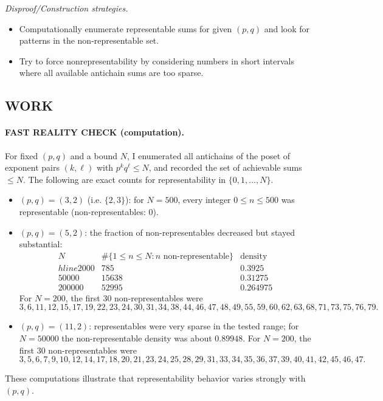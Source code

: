 \emph{Disproof/Construction strategies.}
\begin{itemize}
\item Computationally enumerate representable sums for given $(p,q)$ and look for patterns in the non-representable set.
\item Try to force nonrepresentability by considering numbers in short intervals where all available antichain sums are too sparse.
\end{itemize}

\subsection*{WORK}
\paragraph{FAST REALITY CHECK (computation).}
For fixed $(p,q)$ and a bound $N$, I enumerated all antichains of the poset of exponent pairs $(k,\ell)$ with $p^k q^\ell\le N$, and recorded the set of achievable sums $\le N$.
The following are exact counts for representability in $\{0,1,\dots,N\}$.

\begin{itemize}
\item $(p,q)=(3,2)$ (i.e. $\{2,3\}$): for $N=500$, every integer $0\le n\le 500$ was representable (non-representables: $0$).

\item $(p,q)=(5,2)$: the fraction of non-representables decreased but stayed substantial:
\[
\begin{array}{c|c|c}
N & \#\{1\le n\le N: n \text{ non-representable}\} & \text{density}\\hline
2000 & 785 & 0.3925\\
50000 & 15638 & 0.31275\\
200000 & 52995 & 0.264975
\end{array}
\]
For $N=200$, the first $30$ non-representables were
\[3,6,11,12,15,17,19,22,23,24,30,31,34,38,44,46,47,48,49,55,59,60,62,63,68,71,73,75,76,79.\]

\item $(p,q)=(11,2)$: representables were very sparse in the tested range; for $N=50000$ the non-representable density was about $0.89948$.
For $N=200$, the first $30$ non-representables were
\[3,5,6,7,9,10,12,14,17,18,20,21,23,24,25,28,29,31,33,34,35,36,37,39,40,41,42,45,46,47.\]
\end{itemize}

These computations illustrate that representability behavior varies strongly with $(p,q)$.


